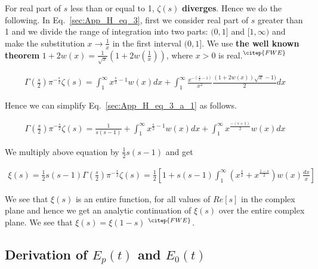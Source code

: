 \documentclass[11pt]{elsarticle}
\begin{document}
For real part of $s$ less than or equal to 1, $\zeta(s)$ \textbf{diverges}. Hence we do the following. In Eq.~\ref{sec:App_H_eq_3}, first we consider real part of $s$ greater than 1 and we divide the range of integration into two parts: $(0,1]$ and $[1, \infty)$ and make the substitution $x \rightarrow \frac{1}{x}$ in the first interval $(0,1]$. We use \textbf{the well known theorem} $ 1 + 2 w(x) = \frac{1}{\sqrt{x}} (1 + 2 w(\frac{1}{x}) )$, where $x > 0$ is real.$^{\citep{FWE}}$


\begin{eqnarray*} \label{sec:App_H_eq_3_a_1}   
\Gamma(\frac{s}{2}) \pi^{-\frac{s}{2}} \zeta(s) = \int_{1}^{\infty} x^{\frac{s}{2}-1} w(x)  dx +  \int_{1}^{\infty} \frac{x^{-(\frac{s}{2}-1)}}{x^2} \frac{(1 + 2 w(x)) \sqrt{x} - 1)}{2}  dx
 \end{eqnarray*}
\begin{equation} \end{equation}

Hence we can simplify Eq.~\ref{sec:App_H_eq_3_a_1} as follows.

\begin{eqnarray*}  \label{sec:App_H_eq_3_a_2}   
\Gamma(\frac{s}{2}) \pi^{-\frac{s}{2}} \zeta(s) = \frac{1}{s (s-1)} + \int_{1}^{\infty} x^{\frac{s}{2}-1} w(x)  dx + \int_{1}^{\infty} x^{\frac{-(s+1)}{2}} w(x)  dx
\end{eqnarray*}
\begin{equation}  \end{equation}


We multiply above equation by $\frac{1}{2} s (s-1)$ and get

\begin{eqnarray*} \label{sec:App_H_eq_3_1} 
\xi(s) = \frac{1}{2} s (s-1) \Gamma(\frac{s}{2}) \pi^{-\frac{s}{2}} \zeta(s) =  \frac{1}{2} [ 1 +  s (s-1)  \int_{1}^{\infty} ( x^{\frac{s}{2}} + x^{\frac{1-s}{2}}) w(x)  \frac{dx}{x}  ]
\end{eqnarray*}
\begin{equation}  \end{equation}

We see that $\xi(s)$ is an entire function, for all values of  $Re[s]$ in the complex plane and hence we get an analytic continuation of $\xi(s)$ over the entire complex plane. We see that $\xi(s) = \xi(1-s)$  $^{\citep{FWE}}$.\\

\subsection{\label{sec:appendix_H_1} \textbf{Derivation of $E_p(t)$ and $E_0(t)$ } \protect\\  \lowercase{} }
\end{document}
